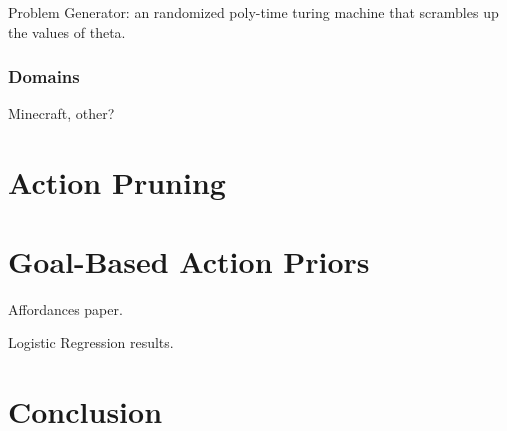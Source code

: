 \documentclass[11pt]{article}
\begin{document}
Problem Generator: an randomized poly-time turing machine that scrambles up the values of theta.

\subsubsection{Domains}

Minecraft, other?


\section{Action Pruning}



\section{Goal-Based Action Priors}

Affordances paper.


Logistic Regression results.

\section{Conclusion}
\end{document}
